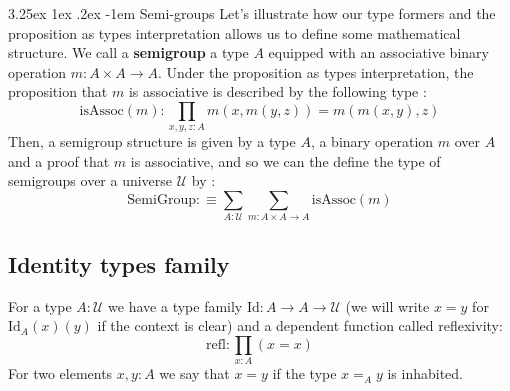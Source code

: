 \documentclass{report}
\makeatletter
\renewcommand\paragraph{\@startsection{paragraph}{5}{\z@}%
  {3.25ex \@plus1ex \@minus.2ex}%
  {-1em}%
  {\normalfont\normalsize\bfseries}}
\makeatother
\begin{document}
\paragraph{Semi-groups}
Let's illustrate how our type formers and the proposition as types interpretation allows us to define some mathematical structure. We call a \textbf{semigroup} a type $A$ equipped with an associative binary operation $m : A \times A \rightarrow A$. Under the proposition as types interpretation, the proposition that $m$ is associative is described by the following type : 
$$\mathrm{isAssoc}(m) : \prod_{x,y,z : A }m(x,m(y,z))=m(m(x,y),z)$$
Then, a semigroup structure is given by a type $A$, a binary operation $m$ over $A$ and a proof that $m$ is associative, and so we can the define the type of semigroups over a universe $\mathcal{U}$ by : 
$$\mathrm{SemiGroup} :\equiv \sum_{A : \mathcal{U}} \sum_{m : A \times A \rightarrow A} \mathrm{isAssoc}(m)$$
\subsection{Identity types family}
For a type $A: \mathcal{U}$ we have a type family $\mathrm{Id} : A \rightarrow A \rightarrow \mathcal{U}$ (we will write $x=y$ for $\mathrm{Id}_A(x)(y)$ if the context is clear) and a dependent function called reflexivity:
$$\mathrm{refl} : \prod_{x : A} (x=x)$$
For two elements $x,y : A$ we say that $x=y$ if the type $x=_A y$ is inhabited.
\end{document}
